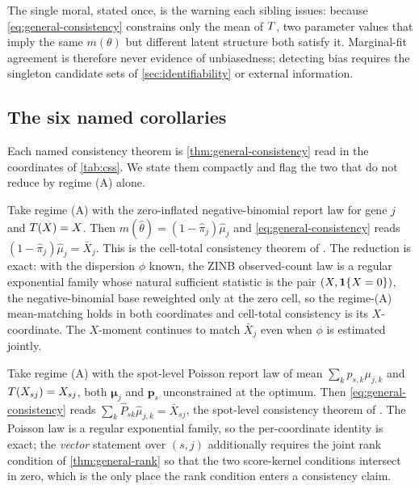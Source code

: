 The single moral, stated once, is the warning each sibling issues:
because \eqref{eq:general-consistency} constrains only the mean of
$T$, two parameter values that imply the same $m(\theta)$ but
different latent structure both satisfy it. Marginal-fit agreement is
therefore never evidence of unbiasedness; detecting bias requires the
singleton candidate sets of \cref{sec:identifiability} or external
information.

\subsection{The six named corollaries}

Each named consistency theorem is \cref{thm:general-consistency} read
in the coordinates of \cref{tab:css}. We state them compactly and flag
the two that do not reduce by regime (A) alone.

\begin{corollary}
\label{cor:scrna}
Take regime (A) with the zero-inflated negative-binomial report law
for gene $j$ and $T(X) = X$. Then $m(\hat\theta) = (1 -
\hat\pi_j)\hat\mu_j$ and \eqref{eq:general-consistency} reads $(1 -
\hat\pi_j)\hat\mu_j = \bar X_j$. This is the cell-total consistency
theorem of \citet{towell2026scrnacoarsening}. The reduction is exact:
with the dispersion $\phi$ known, the ZINB
observed-count law is a regular exponential family whose natural
sufficient statistic is the pair $(X, \mathbf{1}\{X = 0\})$, the
negative-binomial base reweighted only at the zero cell, so the
regime-(A) mean-matching holds in both coordinates and cell-total
consistency is its $X$-coordinate. The $X$-moment continues to match
$\bar X_j$ even when $\phi$ is estimated jointly.
\end{corollary}

\begin{corollary}
\label{cor:spatial}
Take regime (A) with the spot-level Poisson report law of mean $\sum_k
p_{s,k}\mu_{j,k}$ and $T(X_{sj}) = X_{sj}$, both $\bm\mu_j$ and
$\bm p_s$ unconstrained at the optimum. Then
\eqref{eq:general-consistency} reads $\sum_k \hat P_{sk}\hat\mu_{j,k} =
\bar X_{sj}$, the spot-level consistency theorem of
\citet{towell2026spatialcoarsening}. The Poisson law is a regular
exponential family, so the per-coordinate identity is exact; the
\emph{vector} statement over $(s,j)$ additionally requires the joint
rank condition of \cref{thm:general-rank} so that the two score-kernel
conditions intersect in zero, which is the only place the rank
condition enters a consistency claim.
\end{corollary}


